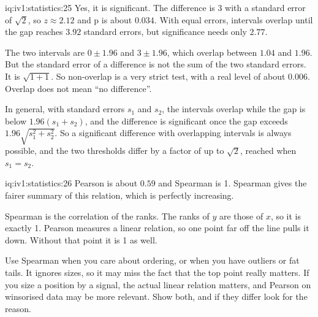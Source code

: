 \begin{solution}{iq:iv1:statistics:25}
Yes, it is significant. The difference is 3 with a standard error of $\sqrt{2}$, so $z \approx 2.12$ and p is about $0.034$. With equal errors, intervals overlap until the gap reaches $3.92$ standard errors, but significance needs only $2.77$.

The two intervals are $0 \pm 1.96$ and $3 \pm 1.96$, which overlap between $1.04$ and $1.96$. But the standard error of a difference is not the sum of the two standard errors. It is $\sqrt{1 + 1}$. So non-overlap is a very strict test, with a real level of about $0.006$. Overlap does not mean ``no difference''.

In general, with standard errors $s_1$ and $s_2$, the intervals overlap while the gap is below $1.96(s_1 + s_2)$, and the difference is significant once the gap exceeds $1.96\sqrt{s_1^2 + s_2^2}$. So a significant difference with overlapping intervals is always possible, and the two thresholds differ by a factor of up to $\sqrt{2}$, reached when $s_1 = s_2$.

\end{solution}

\begin{solution}{iq:iv1:statistics:26}
Pearson is about $0.59$ and Spearman is 1. Spearman gives the fairer summary of this relation, which is perfectly increasing.

Spearman is the correlation of the ranks. The ranks of $y$ are those of $x$, so it is exactly 1. Pearson measures a linear relation, so one point far off the line pulls it down. Without that point it is 1 as well.

Use Spearman when you care about ordering, or when you have outliers or fat tails. It ignores sizes, so it may miss the fact that the top point really matters. If you size a position by a signal, the actual linear relation matters, and Pearson on winsorised data may be more relevant. Show both, and if they differ look for the reason.

\end{solution}

